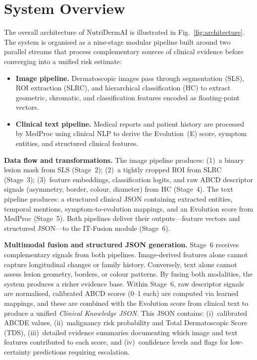 \documentclass[conference]{IEEEtran}
\begin{document}
\section{System Overview}

The overall architecture of NutriDermAI is illustrated in
Fig.~\ref{fig:architecture}. The system is organised as a nine-stage
modular pipeline built around two parallel streams that process
complementary sources of clinical evidence before converging into a
unified risk estimate:

\begin{itemize}[leftmargin=*]
    \item \textbf{Image pipeline.} Dermatoscopic images pass through
          segmentation (SLS), ROI extraction (SLRC), and hierarchical
          classification (HC) to extract geometric, chromatic, and
          classification features encoded as floating-point vectors.
    \item \textbf{Clinical text pipeline.} Medical reports and patient
          history are processed by MedProc using clinical NLP to derive
          the Evolution~(E) score, symptom entities, and structured
          clinical features.
\end{itemize}

\textbf{Data flow and transformations.} The image pipeline produces:
(1)~a binary lesion mask from SLS (Stage~2); (2)~a tightly cropped ROI
from SLRC (Stage~3); (3)~feature embeddings, classification logits, and
raw ABCD descriptor signals (asymmetry, border, colour, diameter) from HC
(Stage~4). The text pipeline produces: a structured clinical JSON
containing extracted entities, temporal mentions, symptom-to-evolution
mappings, and an Evolution score from MedProc (Stage~5). Both pipelines
deliver their outputs—feature vectors and structured JSON—to the IT-Fusion
module (Stage~6).

\textbf{Multimodal fusion and structured JSON generation.} Stage~6
receives complementary signals from both pipelines. Image-derived features
alone cannot capture longitudinal changes or family history. Conversely,
text alone cannot assess lesion geometry, borders, or colour patterns. By
fusing both modalities, the system produces a richer evidence base. Within
Stage~6, raw descriptor signals are normalised, calibrated ABCD scores
(0--1 each) are computed via learned mappings, and these are combined with
the Evolution score from clinical text to produce a unified \emph{Clinical
Knowledge JSON}. This JSON contains: (i)~calibrated ABCDE values,
(ii)~malignancy risk probability and Total Dermatoscopic Score (TDS),
(iii)~detailed evidence summaries documenting which image and text features
contributed to each score, and (iv)~confidence levels and flags for
low-certainty predictions requiring escalation.
\end{document}
